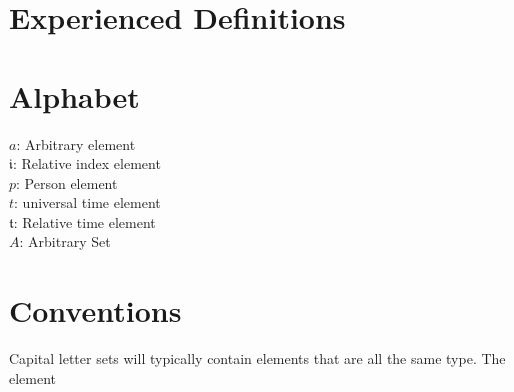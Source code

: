 \documentclass[]{article}
\begin{document}
%
\section*{Experienced Definitions}
\section*{Alphabet}
$a$: Arbitrary element \\
$\mathfrak{i}$: Relative index element \\
$p$: Person element \\
$t$: universal time element \\
$\mathfrak{t}$: Relative time element \\
$A$: Arbitrary Set \\

\section*{Conventions}
Capital letter sets will typically contain elements that are all the same type. The element 
\end{document}
